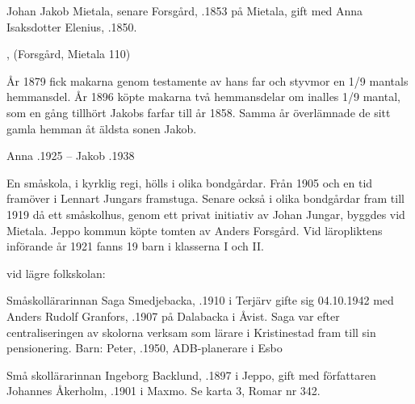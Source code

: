 Johan Jakob Mietala, senare Forsgård, .1853 på Mietala, gift med Anna Isaksdotter Elenius, .1850.
\begin{jhchildren}
  \item {}
  \item {}
  \item {}
  \item {}
  \item {}
  \item {}
  \item {}, (Forsgård, Mietala 110)
\end{jhchildren}

År 1879 fick makarna genom testamente av hans far och styvmor en 1/9 mantals hemmansdel. År 1896 köpte makarna två hemmansdelar om inalles 1/9 mantal, som en gång tillhört Jakobs farfar till år 1858. Samma år överlämnade de sitt gamla hemman åt äldsta sonen Jakob.

Anna .1925  --  Jakob .1938






En småskola, i kyrklig regi, hölls i olika bondgårdar. Från 1905 och en tid framöver i Lennart Jungars framstuga. Senare också i olika bondgårdar fram till 1919 då ett småskolhus, genom ett privat initiativ av Johan Jungar, byggdes vid Mietala. Jeppo kommun köpte tomten av Anders Forsgård. Vid läropliktens införande år 1921 fanns 19 barn i klasserna I och II.


 vid lägre folkskolan:

Småskollärarinnan Saga Smedjebacka, .1910 i Terjärv gifte sig 04.10.1942 med Anders Rudolf Granfors, .1907 på Dalabacka i Åvist. Saga var efter centraliseringen av skolorna verksam som lärare i Kristinestad fram till sin pensionering.
Barn: Peter, .1950, ADB-planerare i Esbo


Små skollärarinnan Ingeborg Backlund, .1897 i Jeppo, gift med författaren Johannes Åkerholm, .1901 i Maxmo. Se karta 3, Romar nr 342.
\begin{jhchildren}
  \item {}
  \item {}
  \item {}
\end{jhchildren}


